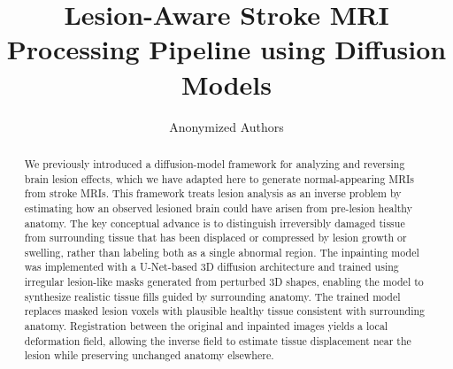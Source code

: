 \documentclass[runningheads]{llncs}
\begin{document}
%
\title{Lesion-Aware Stroke MRI Processing Pipeline using Diffusion Models}
%

\author{Anonymized Authors}  %
  
\maketitle              %
%
\begin{abstract}
We previously introduced a diffusion-model framework for analyzing and reversing brain lesion effects, which we have adapted here to generate normal-appearing MRIs from stroke MRIs. This framework treats lesion analysis as an inverse problem by estimating how an observed lesioned brain could have arisen from pre-lesion healthy anatomy. The key conceptual advance is to distinguish irreversibly damaged tissue from surrounding tissue that has been displaced or compressed by lesion growth or swelling, rather than labeling both as a single abnormal region.
The inpainting model was implemented with a U-Net-based 3D diffusion architecture and trained using irregular lesion-like masks generated from perturbed 3D shapes, enabling the model to synthesize realistic tissue fills guided by surrounding anatomy. The trained model replaces masked lesion voxels with plausible healthy tissue consistent with surrounding anatomy. Registration between the original and inpainted images yields a local deformation field, allowing the inverse field to estimate tissue displacement near the lesion while preserving unchanged anatomy elsewhere.


\end{abstract}
\end{document}
